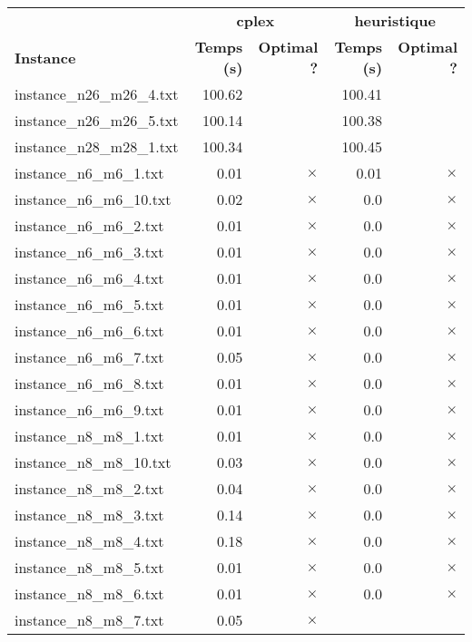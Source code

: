\documentclass{article}
\begin{document}
\newpage
\begin{center}
\renewcommand{\arraystretch}{1.4} 
 \begin{tabular}{lrrrr}
	\hline
 & \multicolumn{2}{c}{\textbf{cplex}} & \multicolumn{2}{c}{\textbf{heuristique}}\\
\textbf{Instance}  & \textbf{Temps (s)} & \textbf{Optimal ?}  & \textbf{Temps (s)} & \textbf{Optimal ?} \\\hline

instance\_n26\_m26\_4.txt & 100.62 & 
 & 100.41 & 
\\
instance\_n26\_m26\_5.txt & 100.14 & 
 & 100.38 & 
\\
instance\_n28\_m28\_1.txt & 100.34 & 
 & 100.45 & 
\\
instance\_n6\_m6\_1.txt & 0.01 & 
$\times$
 & 0.01 & 
$\times$
\\
instance\_n6\_m6\_10.txt & 0.02 & 
$\times$
 & 0.0 & 
$\times$
\\
instance\_n6\_m6\_2.txt & 0.01 & 
$\times$
 & 0.0 & 
$\times$
\\
instance\_n6\_m6\_3.txt & 0.01 & 
$\times$
 & 0.0 & 
$\times$
\\
instance\_n6\_m6\_4.txt & 0.01 & 
$\times$
 & 0.0 & 
$\times$
\\
instance\_n6\_m6\_5.txt & 0.01 & 
$\times$
 & 0.0 & 
$\times$
\\
instance\_n6\_m6\_6.txt & 0.01 & 
$\times$
 & 0.0 & 
$\times$
\\
instance\_n6\_m6\_7.txt & 0.05 & 
$\times$
 & 0.0 & 
$\times$
\\
instance\_n6\_m6\_8.txt & 0.01 & 
$\times$
 & 0.0 & 
$\times$
\\
instance\_n6\_m6\_9.txt & 0.01 & 
$\times$
 & 0.0 & 
$\times$
\\
instance\_n8\_m8\_1.txt & 0.01 & 
$\times$
 & 0.0 & 
$\times$
\\
instance\_n8\_m8\_10.txt & 0.03 & 
$\times$
 & 0.0 & 
$\times$
\\
instance\_n8\_m8\_2.txt & 0.04 & 
$\times$
 & 0.0 & 
$\times$
\\
instance\_n8\_m8\_3.txt & 0.14 & 
$\times$
 & 0.0 & 
$\times$
\\
instance\_n8\_m8\_4.txt & 0.18 & 
$\times$
 & 0.0 & 
$\times$
\\
instance\_n8\_m8\_5.txt & 0.01 & 
$\times$
 & 0.0 & 
$\times$
\\
instance\_n8\_m8\_6.txt & 0.01 & 
$\times$
 & 0.0 & 
$\times$
\\
instance\_n8\_m8\_7.txt & 0.05 & 
$\times$

\end{tabular}
\end{center}
\end{document}
